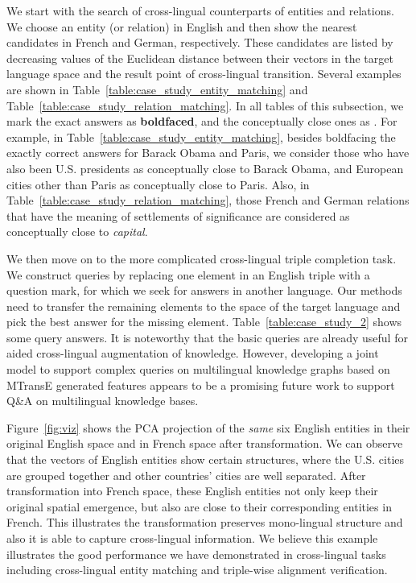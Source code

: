 \documentclass{article}
\begin{document}
We start with the search of cross-lingual counterparts of entities and relations.		
We choose an entity (or relation) in English and then show the nearest candidates in French and German, respectively. 		
These candidates are listed by decreasing values of the Euclidean distance between their vectors in the target language space and the result point of cross-lingual transition.		
Several examples are shown in Table~\ref{table:case_study_entity_matching} and Table~\ref{table:case_study_relation_matching}.
In all tables of this subsection, we mark the exact answers as \textbf{boldfaced}, and the conceptually close ones as .
For example, in Table~\ref{table:case_study_entity_matching}, besides boldfacing the exactly correct answers for Barack Obama and Paris, we consider those who have also been U.S. presidents as conceptually close to Barack Obama, and European cities other than Paris as conceptually close to Paris. Also, in Table~\ref{table:case_study_relation_matching}, those French and German relations that have the meaning of settlements of significance are considered as conceptually close to \emph{capital}.
\par


We then move on to the more complicated cross-lingual triple completion task.		
We construct queries by replacing one element in an English triple with a question mark,
for which we seek for answers in another language.
Our methods need to transfer the remaining elements to the space of the target language		
and pick the best answer for the missing element.		
Table~\ref{table:case_study_2} shows some query answers.
It is noteworthy that the basic queries are already useful for aided cross-lingual augmentation of knowledge.
However, developing a joint model to support complex queries on multilingual knowledge graphs based on MTransE generated features appears to be a promising future work to support Q\&A on multilingual knowledge bases.
\par

Figure~\ref{fig:viz} shows the PCA projection of the {\em same} six English entities in their original English space and in French space after transformation.
We can observe that the vectors of English entities show certain structures, where the U.S. cities are grouped together and other countries' cities are well separated.
After transformation into French space, these English entities not only keep their original spatial emergence, but also are close to their corresponding entities in French.
This illustrates the transformation preserves mono-lingual structure and also it is able to capture cross-lingual information.
We believe this example illustrates the good performance we have demonstrated in cross-lingual tasks including cross-lingual entity matching and triple-wise alignment verification.
\par
\end{document}
